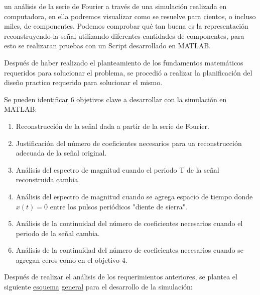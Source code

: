 \documentclass[11pt,a4paper,twocolumn]{article}
\begin{document}
    un análisis de la serie de Fourier a través de una simulación realizada en computadora, en ella podremos 
    visualizar como se resuelve para cientos, o incluso miles, de componentes. Podemos comprobar qué tan buena 
    es la representación reconstruyendo la señal utilizando diferentes cantidades de componentes, para esto 
    se realizaran pruebas con un Script desarrollado en MATLAB.
    
    Después de haber realizado el planteamiento de los fundamentos matemáticos requeridos para solucionar 
    el problema, se procedió a realizar la planificación del diseño practico requerido para solucionar 
    el mismo.
    
    Se pueden identificar 6 objetivos clave a desarrollar con la simulación en MATLAB:

    \begin{enumerate}
        \item Reconstrucción de la señal dada a partir de la serie de Fourier.
        \item Justificación del número de coeficientes necesarios para ua reconstrucción adecuada de la 
            señal original.
        \item Análisis del espectro de magnitud cuando el periodo T de la señal reconstruida cambia.
        \item Análisis del espectro de magnitud cuando se agrega espacio de tiempo donde $x(t)=0$ entre 
            los pulsos periódicos "diente de sierra".
        \item Análisis de la continuidad del número de coeficientes necesarios cuando el periodo de la 
            señal cambia.
        \item Análisis de la continuidad del número de coeficientes necesarios cuando se agregan ceros 
            como en el objetivo 4.
    \end{enumerate}

    Después de realizar el análisis de los requerimientos anteriores, se plantea el siguiente \underline{esquema}
    \underline{general} para el desarrollo de la simulación:
    
\end{document}

